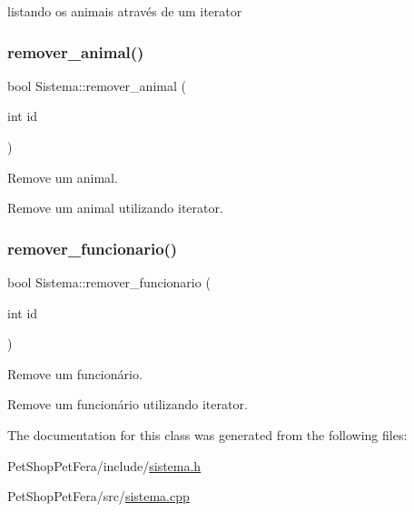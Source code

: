 listando os animais através de um iterator \mbox{\label{class_sistema_a05daf6b3c0d5c65627965eb9b331deac}} 
\subsubsection{\texorpdfstring{remover\_animal()}{remover\_animal()}}
{\footnotesize\ttfamily bool Sistema\+::remover\+\_\+animal (\begin{DoxyParamCaption}\item[{int}]{id }\end{DoxyParamCaption})}



Remove um animal. 

Remove um animal utilizando iterator. \mbox{\label{class_sistema_a890a6f3c58e05fc38d372b270b2a3180}} 
\subsubsection{\texorpdfstring{remover\_funcionario()}{remover\_funcionario()}}
{\footnotesize\ttfamily bool Sistema\+::remover\+\_\+funcionario (\begin{DoxyParamCaption}\item[{int}]{id }\end{DoxyParamCaption})}



Remove um funcionário. 

Remove um funcionário utilizando iterator. 

The documentation for this class was generated from the following files\+:\begin{DoxyCompactItemize}
\item 
Pet\+Shop\+Pet\+Fera/include/\mbox{\hyperlink{sistema_8h}{sistema.\+h}}\item 
Pet\+Shop\+Pet\+Fera/src/\mbox{\hyperlink{sistema_8cpp}{sistema.\+cpp}}\end{DoxyCompactItemize}
